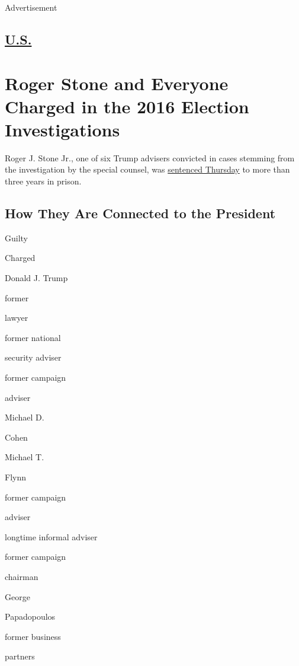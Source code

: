 Advertisement

\hypertarget{-us-}{%
\subsection{\texorpdfstring{
\href{https://www.nytimes.com/section/us}{U.S.} }{ U.S. }}\label{-us-}}

\hypertarget{roger-stone-and-everyone-charged-in-the-2016-election-investigations}{%
\section{Roger Stone and Everyone Charged in the 2016 Election
Investigations}\label{roger-stone-and-everyone-charged-in-the-2016-election-investigations}}

Roger J. Stone Jr., one of six Trump advisers convicted in cases
stemming from the investigation by the special counsel, was
\href{https://www.nytimes.com/2020/02/20/us/roger-stone-sentencing.html}{sentenced
Thursday} to more than three years in prison.

\hypertarget{how-they-are-connected-to-the-president}{%
\subsection{How They Are Connected to the
President}\label{how-they-are-connected-to-the-president}}

Guilty

Charged

Donald J. Trump

former

lawyer

former national

security adviser

former campaign

adviser

Michael D.

Cohen

Michael T.

Flynn

former campaign

adviser

longtime informal adviser

former campaign

chairman

George

Papadopoulos

former business

partners

